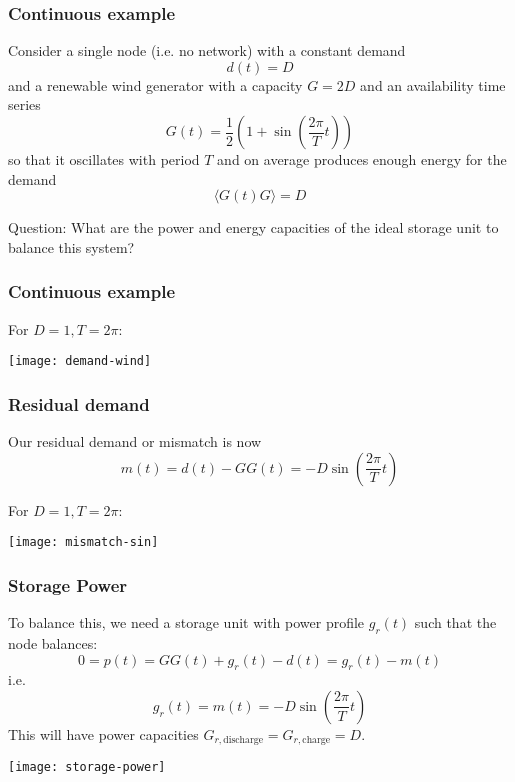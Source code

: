 \documentclass[10pt,aspectratio=169,dvipsnames]{beamer}
\begin{document}
\begin{frame}
  \frametitle{Continuous example}

  Consider a single node (i.e. no network) with a constant demand
  \begin{equation*}
    d(t) = D
  \end{equation*}
  and a renewable wind generator with a capacity $G = 2D$ and an
  availability time series
  \begin{equation*}
    G(t) = \frac{1}{2} \left(1 + \sin\left(\frac{2\pi}{T} t\right)\right)
  \end{equation*}
  so that it oscillates with period $T$ and on average produces enough energy for the demand
  \begin{equation*}
    \langle G(t) G \rangle = D
  \end{equation*}

  \alert{Question}: What are the power and energy capacities of the ideal storage unit to balance this system?
\end{frame}



\begin{frame}
  \frametitle{Continuous example}

  For $D =1, T = 2\pi$:

  \centering
  \texttt{[image: demand-wind]}
\end{frame}



\begin{frame}
  \frametitle{Residual demand}

  Our residual demand or mismatch is now
  \begin{equation*}
    m(t) = d(t) - G G(t) = -D\sin\left(\frac{2\pi}{T} t\right)
  \end{equation*}

  For $D =1, T = 2\pi$:

  \centering
\texttt{[image: mismatch-sin]}


\end{frame}

\begin{frame}
  \frametitle{Storage Power}

  To balance this, we need a storage unit with power profile $g_r(t)$ such that the node balances:
  \begin{equation*}
    0 = p(t) =  GG(t) + g_r(t) - d(t) = g_r(t) - m(t)
  \end{equation*}
  i.e.
  \begin{equation*}
    g_r(t) = m(t) = -D\sin\left(\frac{2\pi}{T} t\right)
  \end{equation*}
  This will have power capacities $G_{r,\textrm{discharge}} = G_{r,\textrm{charge}} = D$.

  \centering
  \texttt{[image: storage-power]}

\end{frame}
\end{document}
